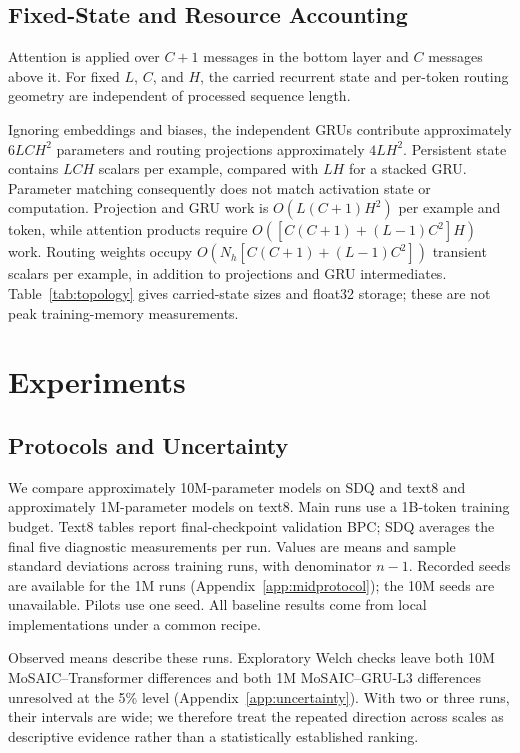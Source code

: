 \documentclass[letterpaper,twoside]{article}
\begin{document}
\subsection{Fixed-State and Resource Accounting}

Attention is applied over $C+1$ messages in the bottom layer and $C$ messages above it. For fixed $L$, $C$, and $H$, the carried recurrent state and per-token routing geometry are independent of processed sequence length.

Ignoring embeddings and biases, the independent GRUs contribute approximately $6LCH^2$ parameters and routing projections approximately $4LH^2$. Persistent state contains $LCH$ scalars per example, compared with $LH$ for a stacked GRU. Parameter matching consequently does not match activation state or computation. Projection and GRU work is $O(L(C+1)H^2)$ per example and token, while attention products require $O([C(C+1)+(L-1)C^2]H)$ work. Routing weights occupy $O(N_h[C(C+1)+(L-1)C^2])$ transient scalars per example, in addition to projections and GRU intermediates. Table~\ref{tab:topology} gives carried-state sizes and float32 storage; these are not peak training-memory measurements.



\section{Experiments}\label{sec:experiments}

\subsection{Protocols and Uncertainty}

We compare approximately 10M-parameter models on SDQ and text8 and approximately 1M-parameter models on text8. Main runs use a 1B-token training budget. Text8 tables report final-checkpoint validation BPC; SDQ averages the final five diagnostic measurements per run. Values are means and sample standard deviations across training runs, with denominator $n-1$. Recorded seeds are available for the 1M runs (Appendix~\ref{app:midprotocol}); the 10M seeds are unavailable. Pilots use one seed. All baseline results come from local implementations under a common recipe.

Observed means describe these runs. Exploratory Welch checks leave both 10M MoSAIC--Transformer differences and both 1M MoSAIC--GRU-L3 differences unresolved at the 5\% level (Appendix~\ref{app:uncertainty}). With two or three runs, their intervals are wide; we therefore treat the repeated direction across scales as descriptive evidence rather than a statistically established ranking.
\end{document}
